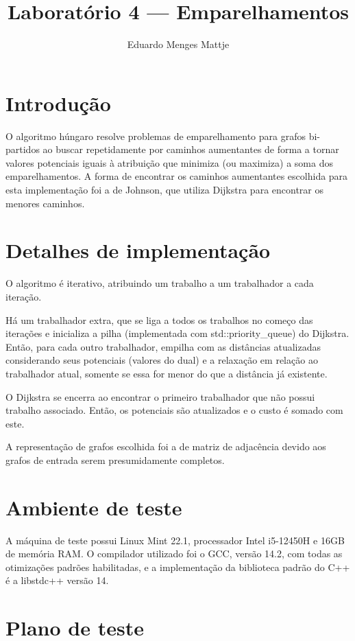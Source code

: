 \documentclass[11pt]{article}
\title{Laboratório 4 — Emparelhamentos}
\author{Eduardo Menges Mattje}
\begin{document}
\maketitle

\section{Introdução}

O algoritmo húngaro resolve problemas de emparelhamento para grafos bi-partidos ao buscar repetidamente por caminhos aumentantes de forma a tornar valores potenciais iguais à atribuição que minimiza (ou maximiza) a soma dos emparelhamentos.
A forma de encontrar os caminhos aumentantes escolhida para esta implementação foi a de Johnson, que utiliza Dijkstra para encontrar os menores caminhos.

\section{Detalhes de implementação}

O algoritmo é iterativo, atribuindo um trabalho a um trabalhador a cada iteração.

Há um trabalhador extra, que se liga a todos os trabalhos no começo das iterações e inicializa a pilha (implementada com std::priority\_queue) do Dijkstra.
Então, para cada outro trabalhador, empilha com as distâncias atualizadas considerando seus potenciais (valores do dual) e a relaxação em relação ao trabalhador atual, somente se essa for menor do que a distância já existente.

O Dijkstra se encerra ao encontrar o primeiro trabalhador que não possui trabalho associado.
Então, os potenciais são atualizados e o custo é somado com este.

A representação de grafos escolhida foi a de matriz de adjacência devido aos grafos de entrada serem presumidamente completos.

\section{Ambiente de teste}

A máquina de teste possui Linux Mint 22.1, processador Intel i5-12450H e 16GB de memória RAM.
O compilador utilizado foi o GCC, versão 14.2, com todas as otimizações padrões habilitadas, e a implementação da biblioteca padrão do C++ é a libstdc++ versão 14.

\section{Plano de teste}
\end{document}
